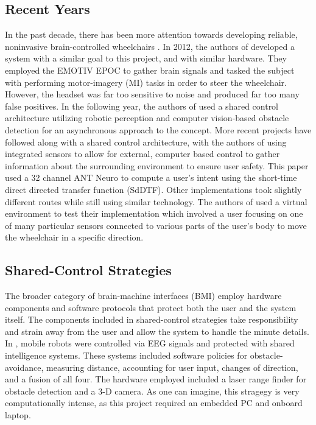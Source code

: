 \documentclass[conference]{IEEEtran}
\begin{document}
    \subsection{Recent Years}
    In the past decade, there has been more attention towards developing reliable, noninvasive brain-controlled wheelchairs \cite{learning_to_control, self_paced, robotic_architecture, toward_brain_computer, biomedical-signal}. In 2012, the authors of \cite{self_paced} developed a system with a similar goal to this project, and with similar hardware. They employed the EMOTIV EPOC to gather brain signals and tasked the subject with performing motor-imagery (MI) tasks in order to steer the wheelchair. However, the headset was far too sensitive to noise and produced far too many false positives. In the following year, the authors of \cite{robotic_architecture} used a shared control architecture utilizing robotic perception and computer vision-based obstacle detection for an asynchronous approach to the concept. More recent projects have followed along with a shared control architecture, with the authors of \cite{learning_to_control} using integrated sensors to allow for external, computer based control to gather information about the surrounding environment to ensure user safety. This paper used a 32 channel ANT Neuro to compute a user's intent using the short-time direct directed transfer function (SdDTF). Other implementations took slightly different routes while still using similar technology. The authors of \cite{toward_brain_computer} used a virtual environment to test their implementation which involved a user focusing on one of many particular sensors connected to various parts of the user's body to move the wheelchair in a specific direction. 

    \subsection{Shared-Control Strategies}
    The broader category of brain-machine interfaces (BMI) employ hardware components and software protocols that protect both the user and the system itself. The components included in shared-control strategies take responsibility and strain away from the user and allow the system to handle the minute details. In \cite{robo-teleop}, mobile robots were controlled via EEG signals and protected with shared intelligence systems. These systems included software policies for obstacle-avoidance, measuring distance, accounting for user input, changes of direction, and a fusion of all four. The hardware employed included a laser range finder for obstacle detection and a 3-D camera. As one can imagine, this stragegy is very computationally intense, as this project required an embedded PC and onboard laptop.  
\end{document}
